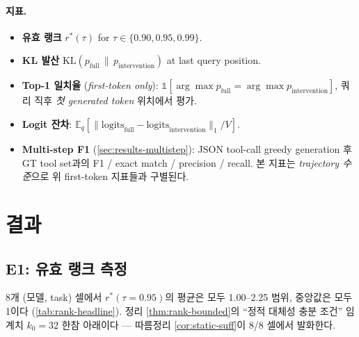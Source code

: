 \documentclass{article}
\theoremstyle{definition}
\newcommand{\E}{\mathbb{E}}
\begin{document}
\paragraph{지표.}
\begin{itemize}[leftmargin=*]
\item \textbf{유효 랭크} $r^*(\tau)$ for $\tau \in \{0.90, 0.95, 0.99\}$.
\item \textbf{KL 발산} $\mathrm{KL}(p_{\mathrm{full}} \,\|\, p_{\mathrm{intervention}})$ at last query position.
\item \textbf{Top-1 일치율} (\emph{first-token only}): $\mathbb{1}[\arg\max p_{\mathrm{full}} = \arg\max p_{\mathrm{intervention}}]$, 쿼리 직후 \emph{첫 generated token} 위치에서 평가.
\item \textbf{Logit 잔차}: $\E_q[\|\mathrm{logits}_{\mathrm{full}} - \mathrm{logits}_{\mathrm{intervention}}\|_1 / V]$.
\item \textbf{Multi-step F1} (\cref{sec:results-multistep}): JSON tool-call greedy generation 후 GT tool set과의 F1 / exact match / precision / recall. 본 지표는 \emph{trajectory 수준}으로 위 first-token 지표들과 구별된다.
\end{itemize}

\section{결과}
\label{sec:results}

\subsection{E1: 유효 랭크 측정}
\label{sec:results-rank}

8개 (모델, task) 셀에서 $r^*(\tau{=}0.95)$의 평균은 모두 1.00--2.25 범위, 중앙값은 모두 1이다 (\cref{tab:rank-headline}). 정리 \ref{thm:rank-bounded}의 ``정적 대체성 충분 조건'' 임계치 $k_0 = 32$ 한참 아래이다 --- 따름정리 \ref{cor:static-suff}이 8/8 셀에서 발화한다.
\end{document}

